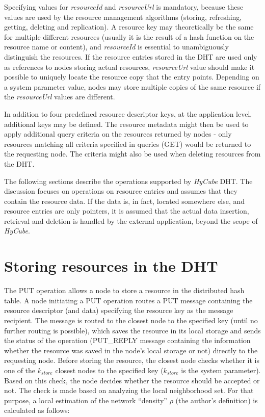 Specifying values for \emph{resourceId} and \emph{resourceUrl} is mandatory, because these values are used by the resource management algorithms (storing, refreshing, getting, deleting and replication). A resource key may theoretically be the same for multiple different resources (usually it is the result of a hash function on the resource name or content), and \emph{resourceId} is essential to unambiguously distinguish the resources. If the resource entries stored in the DHT are used only as references to nodes storing actual resources, \emph{resourceUrl} value should make it possible to uniquely locate the resource copy that the entry points. Depending on a system parameter value, nodes may store multiple copies of the same resource if the \emph{resourceUrl} values are different.

In addition to four predefined resource descriptor keys, at the application level, additional keys may be defined. The resource metadata might then be used to apply additional query criteria on the resources returned by nodes - only resources matching all criteria specified in queries (GET) would be returned to the requesting node. The criteria might also be used when deleting resources from the DHT.

The following sections describe the operations supported by \emph{HyCube} DHT. The discussion focuses on operations on resource entries and assumes that they contain the resource data. If the data is, in fact, located somewhere else, and resource entries are only pointers, it is assumed that the actual data insertion, retrieval and deletion is handled by the external application, beyond the scope of \emph{HyCube}.




\section{Storing resources in the DHT}

The PUT operation allows a node to store a resource in the distributed hash table. A node initiating a PUT operation routes a PUT message containing the resource descriptor (and data) specifying the resource key as the message recipient. The message is routed to the closest node to the specified key (until no further routing is possible), which saves the resource in its local storage and sends the status of the operation (PUT\_REPLY message containing the information whether the resource was saved in the node's local storage or not) directly to the requesting node. Before storing the resource, the closest node checks whether it is one of the $k_{store}$ closest nodes to the specified key ($k_{store}$ is the system parameter). Based on this check, the node decides whether the resource should be accepted or not. The check is made based on analyzing the local neighborhood set. For that purpose, a local estimation of the network ``density'' $\rho$ (the author's definition) is calculated as follows:

